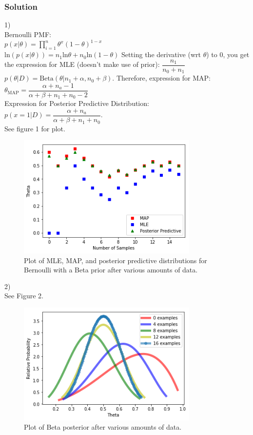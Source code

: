 \documentclass[submit]{harvardml}
\begin{document}
\subsubsection*{Solution}
1)\\
Bernoulli PMF:\\
$p(x|\theta)=\prod_{i=1}^{n}\theta^x(1-\theta)^{1-x}$\\
$\textrm{ln}(p(x|\theta))=n_1\textrm{ln}\theta+n_0\textrm{ln}(1-\theta)$
Setting the derivative (wrt $\theta$) to $0$, you get the expression for MLE (doesn't make use of prior): $\dfrac{n_1}{n_0+n_1}$
\\
$p(\theta|D) = \textrm{Beta}(\theta|n_1+\alpha,n_0+\beta)$. Therefore, expression for MAP:\\
$\theta_{\textrm{MAP}}=\dfrac{\alpha+n_a-1}{\alpha+\beta+n_1+n_0-2}$\\
Expression for Posterior Predictive Distribution:\\
$p(x=1|D) = \dfrac{\alpha+n_a}{\alpha+\beta+n_1+n_0}$.\\
See figure 1 for plot.
\\
\begin{figure}[h]
\centering
\includegraphics[width=0.8\textwidth]{h2_figure1}
\caption{Plot of MLE, MAP, and posterior predictive distributions for Bernoulli with a Beta prior after various amounts of data.}
\label{fig:1.1}
\end{figure}

2)\\
See Figure 2.\\
\begin{figure}[h]
\centering
\includegraphics[width=0.8\textwidth]{h2_figure2}
\caption{Plot of Beta posterior after various amounts of data.}
\label{fig:1.1}
\end{figure}
\end{document}
